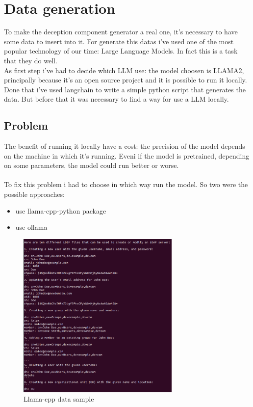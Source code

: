 \chapter{Data generation}
To make the deception component generator a real one, it's necessary to have some data to insert into it.
For generate this datas i've used one of the most popular technology of our time: Large Language Models. In fact this is a task that they do well.
\\
As first step i've had to decide which LLM use: the model choosen is LLAMA2, principally because it's an open source project and it is possible to run it locally.
Done that i've used langchain \cite{langchain} to write a simple python script that generates the data. But before that it was necessary to find a way for use a LLM locally.
\section{Problem}
The benefit of running it locally have a cost: the precision of the model depends on the machine in which it's running. Eveni if the model is pretrained, depending on some parameters, the model could run better or worse.
\\\\
To fix this problem i had to choose in which way run the model. So two were the possible approaches:
\begin{itemize}
    \item use llama-cpp-python package
    \item use ollama
\end{itemize}
\begin{figure}[h]
    \caption{Llama-cpp data sample}
    \centering
    \includegraphics[width=8cm]{img/llamacpp.png}
\end{figure}
